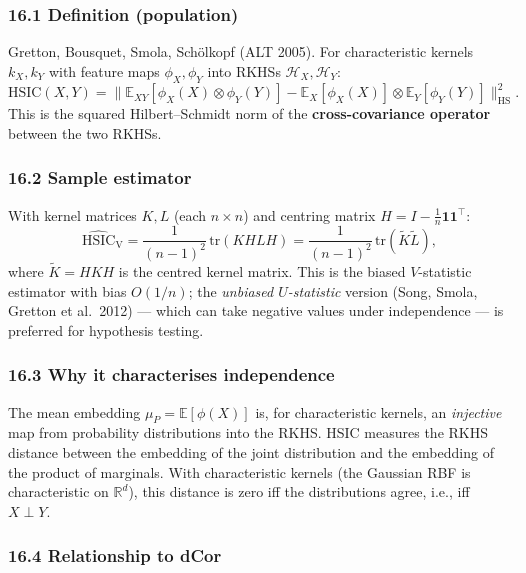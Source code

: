 \documentclass{article}
\begin{document}
\subsubsection{16.1 Definition
(population)}\label{161-definition-population}

Gretton, Bousquet, Smola, Schölkopf (ALT 2005). For characteristic
kernels \(k_X, k_Y\) with feature maps \(\phi_X, \phi_Y\) into RKHSs
\(\mathcal{H}_X, \mathcal{H}_Y\): \[
\mathrm{HSIC}(X, Y) = \|\mathbb{E}_{XY}[\phi_X(X) \otimes \phi_Y(Y)] - \mathbb{E}_X[\phi_X(X)] \otimes \mathbb{E}_Y[\phi_Y(Y)]\|_{\mathrm{HS}}^2.
\] This is the squared Hilbert--Schmidt norm of the
\textbf{cross-covariance operator} between the two RKHSs.

\subsubsection{16.2 Sample estimator}\label{162-sample-estimator}

With kernel matrices \(K, L\) (each \(n \times n\)) and centring matrix
\(H = I - \tfrac{1}{n}\mathbf{1}\mathbf{1}^\top\): \[
\widehat{\mathrm{HSIC}}_{\mathrm{V}} = \frac{1}{(n - 1)^2}\, \mathrm{tr}(K H L H) = \frac{1}{(n - 1)^2}\, \mathrm{tr}(\tilde{K} \tilde{L}),
\] where \(\tilde{K} = HKH\) is the centred kernel matrix. This is the
biased \(V\)-statistic estimator with bias \(O(1/n)\); the
\emph{unbiased \(U\)-statistic} version (Song, Smola, Gretton et al.\
2012) --- which can take negative values under independence ---
is preferred for hypothesis testing.

\subsubsection{16.3 Why it characterises
independence}\label{163-why-it-characterises-independence}

The mean embedding \(\mu_P = \mathbb{E}[\phi(X)]\) is, for
characteristic kernels, an \emph{injective} map from probability
distributions into the RKHS. HSIC measures the RKHS distance between the
embedding of the joint distribution and the embedding of the product of
marginals. With characteristic kernels (the Gaussian RBF is
characteristic on \(\mathbb{R}^d\)), this distance is zero iff the
distributions agree, i.e., iff \(X \perp Y\).

\subsubsection{16.4 Relationship to
dCor}\label{164-relationship-to-dcor}
\end{document}

